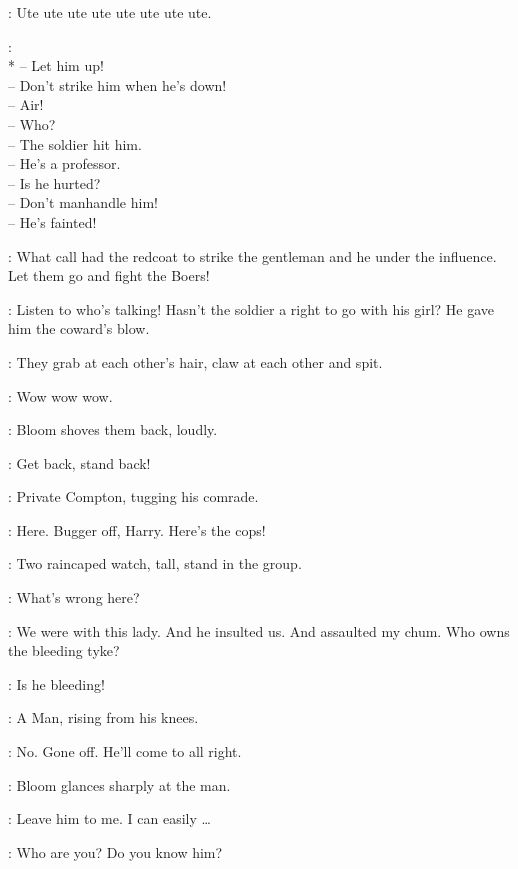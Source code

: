 \Retriever:
Ute ute ute ute ute ute ute ute.

\Crowd[2]:\\*
-- Let him up!\\
-- Don't strike him when he's down!\\
-- Air!\\
-- Who?\\
-- The soldier hit him.\\
-- He's a professor.\\
-- Is he hurted?\\
-- Don't manhandle him!\\
-- He's fainted!

\Hag[1]:
What call had the redcoat to strike the gentleman and he under the influence.
Let them go and fight the Boers!

\Bawd[2]:
Listen to who's talking!
Hasn't the soldier a right to go with his girl?
He gave him the coward's blow.

:
They grab at each other's hair, claw at each other and spit.

\Retriever:
Wow wow wow.

:
Bloom shoves them back, loudly.

\Bloom:
Get back, stand back!

:
Private Compton, tugging his comrade.

\Compton:
Here.
Bugger off, Harry.
Here's the cops!


:
Two raincaped watch, tall, stand in the group.

\FirstWatch[1]:
What's wrong here?

\Compton:
We were with this lady.
And he insulted us.
And assaulted my chum.
Who owns the bleeding tyke?

\Cissy:
Is he bleeding!

:
A Man, rising from his knees.

\Man:
No.
Gone off.
He'll come to all right.

:
Bloom glances sharply at the man.

\Bloom:
Leave him to me.
I can easily \ldots

\SecondWatch[2]:
Who are you?
Do you know him?

